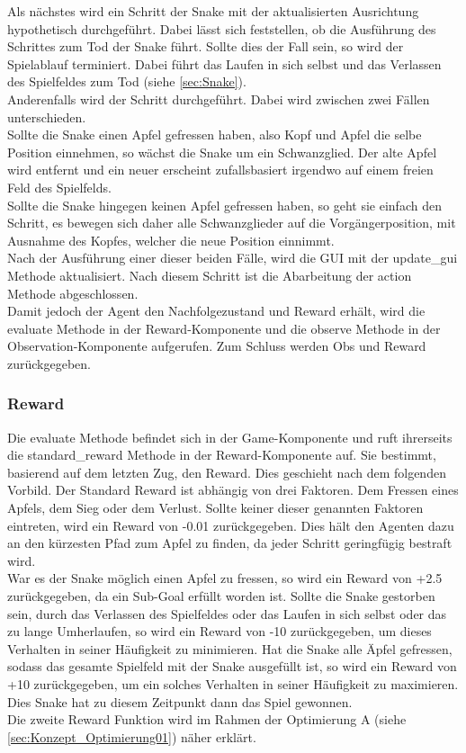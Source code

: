Als nächstes wird ein Schritt der Snake mit der aktualisierten Ausrichtung hypothetisch durchgeführt. Dabei lässt sich feststellen, ob die Ausführung des Schrittes zum Tod der Snake führt. Sollte dies der Fall sein, so wird der Spielablauf terminiert. Dabei führt das Laufen in sich selbst und das Verlassen des Spielfeldes zum Tod (siehe \ref{sec:Snake}).\\ 
Anderenfalls wird der Schritt durchgeführt. Dabei wird zwischen zwei Fällen unterschieden.\\
Sollte die Snake einen Apfel gefressen haben, also Kopf und Apfel die selbe Position einnehmen, so wächst die Snake um ein Schwanzglied. Der alte Apfel wird entfernt und ein neuer erscheint zufallsbasiert irgendwo auf einem freien Feld des Spielfelds.\\
Sollte die Snake hingegen keinen Apfel gefressen haben, so geht sie einfach den Schritt, es bewegen sich daher alle Schwanzglieder auf die Vorgängerposition, mit Ausnahme des Kopfes, welcher die neue Position einnimmt.\\
Nach der Ausführung einer dieser beiden Fälle, wird die GUI mit der update\_gui Methode aktualisiert. Nach diesem Schritt ist die Abarbeitung der action Methode abgeschlossen.\\
Damit jedoch der Agent den Nachfolgezustand und Reward erhält, wird die evaluate Methode in der Reward-Komponente und die observe Methode in der Observation-Komponente aufgerufen.
Zum Schluss werden Obs und Reward zurückgegeben.

\subsubsection{Reward} \label{sec:Konzept_Reward}
Die evaluate Methode befindet sich in der Game-Komponente und ruft ihrerseits die standard\_reward Methode in der Reward-Komponente auf. Sie bestimmt, basierend auf dem letzten Zug, den Reward. Dies geschieht nach dem folgenden Vorbild.
Der Standard Reward ist abhängig von drei Faktoren. Dem Fressen eines Apfels, dem Sieg oder dem Verlust. Sollte keiner dieser genannten Faktoren eintreten, wird ein Reward von -0.01 zurückgegeben. Dies hält den Agenten dazu an den kürzesten Pfad zum Apfel zu finden, da jeder Schritt geringfügig bestraft wird.\\
War es der Snake möglich einen Apfel zu fressen, so wird ein Reward von +2.5 zurückgegeben, da ein Sub-Goal erfüllt worden ist.
Sollte die Snake gestorben sein, durch das Verlassen des Spielfeldes oder das Laufen in sich selbst oder das zu lange Umherlaufen, so wird ein Reward von -10 zurückgegeben, um dieses Verhalten in seiner Häufigkeit zu minimieren.
Hat die Snake alle Äpfel gefressen, sodass das gesamte Spielfeld mit der Snake ausgefüllt ist, so wird ein Reward von +10 zurückgegeben, um ein solches Verhalten in seiner Häufigkeit zu maximieren. Dies Snake hat zu diesem Zeitpunkt dann das Spiel gewonnen.\\
Die zweite Reward Funktion wird im Rahmen der Optimierung A (siehe \ref{sec:Konzept_Optimierung01}) näher erklärt.

